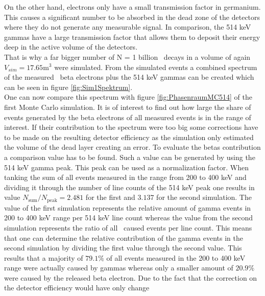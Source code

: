 \documentclass[encoding=utf8,british]{tumphthesis}
\begin{document}
On the other hand, electrons only have a small transmission factor in germanium.
This causes a significant number to be absorbed in the dead zone of the detectors where they do not generate any measurable signal.
In comparison, the 514 keV gammas have a large transmission factor that allows them to deposit their energy deep in the active volume of the detectors.
\\



That is why a far bigger number of N = 1 billion \Kr\ decays in a volume of again $V_{sim} = 17.65 \mathrm{m}^3$ were simulated.
From the simulated events  a combined spectrum of the measured \Kr\ beta electrons plus the 514 keV gammas can be created which can be seen in figure \ref{fig:Sim1Spektrum}.
\\

One can now compare this spectrum with figure \ref{fig:PhasenraumMC514} of the first Monte Carlo simulation.
It is of interest to find out how large the share of events generated by the beta electrons of all measured events is in the range of interest.
If their contribution to the spectrum were too big some corrections have to be made on the resulting detector efficiency as the simulation only estimated the volume of the dead layer creating an error.
To evaluate the betas contribution a comparison value has to be found.
Such a value can be generated by using the 514 keV gamma peak.
This peak can be used as a normalization factor.
When tanking the sum of all events measured in the range from 200 to 400 keV and dividing it through the number of line counts of the 514 keV peak one results in value $N_{\mathrm{sum}}/N_{\mathrm{peak}} = 2.481$ for the first and $3.137$  for the second simulation.
The value of the first simulation represents the relative amount of gamma events in 200 to 400 keV range per 514 keV line count whereas the value from the second simulation represents the ratio of all \Kr\ caused events per line count.
This means that one can determine the relative contribution of the gamma events in the second simulation by dividing the first value through the second value.
This results that a majority of $79.1 \%$ of all events measured in the 200 to 400 keV range were actually caused by gammas whereas only a smaller amount of $20.9 \%$ were caused by the released beta electron.
Due to the fact that the correction on the detector efficiency would have only change
\\
\end{document}
